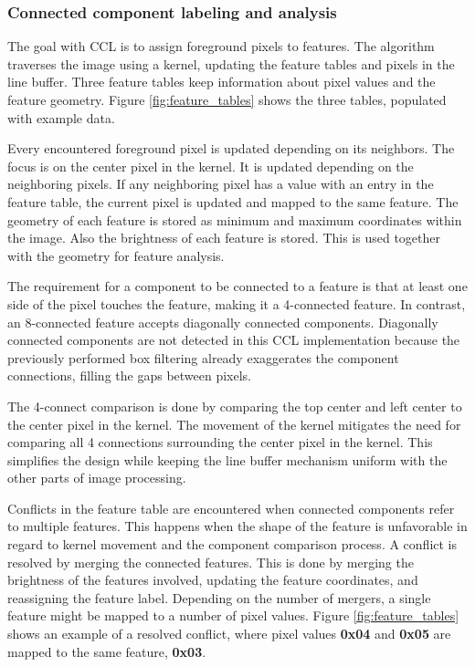 \documentclass[12pt]{report}
\begin{document}
\subsubsection{Connected component labeling and analysis}
The goal with CCL is to assign foreground pixels to features. The algorithm traverses the image using a kernel, updating the feature tables and pixels in the line buffer. Three feature tables keep information about pixel values and the feature geometry. Figure \ref*{fig:feature_tables} shows the three tables, populated with example data.
\par
Every encountered foreground pixel is updated depending on its neighbors. The focus is on the center pixel in the kernel. It is updated depending on the neighboring pixels. If any neighboring pixel has a value with an entry in the feature table, the current pixel is updated and mapped to the same feature. The geometry of each feature is stored as minimum and maximum coordinates within the image. Also the brightness of each feature is stored. This is used together with the geometry for feature analysis.
\par
The requirement for a component to be connected to a feature is that at least one side of the pixel touches the feature, making it a 4-connected feature. In contrast, an 8-connected feature accepts diagonally connected components. Diagonally connected components are not detected in this CCL implementation because the previously performed box filtering already exaggerates the component connections, filling the gaps between pixels.
\par
The 4-connect comparison is done by comparing the top center and left center to the center pixel in the kernel. The movement of the kernel mitigates the need for comparing all 4 connections surrounding the center pixel in the kernel. This simplifies the design while keeping the line buffer mechanism uniform with the other parts of image processing.
\par
Conflicts in the feature table are encountered when connected components refer to multiple features. This happens when the shape of the feature is unfavorable in regard to kernel movement and the component comparison process. A conflict is resolved by merging the connected features. This is done by merging the brightness of the features involved, updating the feature coordinates, and reassigning the feature label. Depending on the number of mergers, a single feature might be mapped to a number of pixel values. Figure \ref*{fig:feature_tables} shows an example of a resolved conflict, where pixel values \textbf{0x04} and \textbf{0x05} are mapped to the same feature, \textbf{0x03}.
\end{document}
